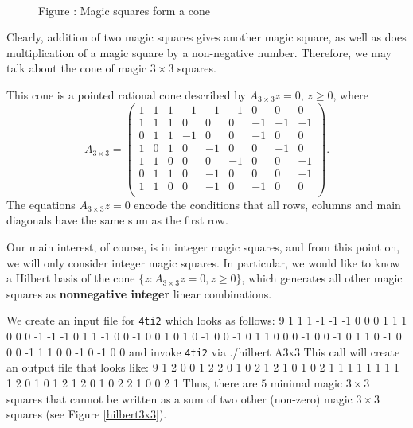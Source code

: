 \documentclass[12pt]{article}
\newenvironment{myverbatim}%
  {\quote\verbatim}%
  {\endverbatim\endquote}
\newcommand\File{\begingroup \urlstyle{sf}\Url}
\theoremstyle{definition}
\newcommand{\important}{\textbf}
\newcommand{\FourTiTwo}{{\tt 4ti2}}
\begin{document}
\begin{figure}[tbh]
\begin{center}
\\[.3cm]
 \label{Cone3x3} Figure \thefigure: Magic
squares form a cone
\end{center}
\vspace*{-0.3cm}
\end{figure}

Clearly, addition of two magic squares gives another magic square,
as well as does multiplication of a magic square by a non-negative
number. Therefore, we may talk about the cone of magic $3\times 3$
squares.

This cone is a pointed rational cone described by 
$A_{3\times 3}z=0$, $z\geq 0$, where
\[
A_{3\times 3}=
\left(
\begin{array}{rrrrrrrrr}
1 & 1 & 1 & -1 & -1 & -1 &  0 &  0 &  0\\
1 & 1 & 1 &  0 &  0 &  0 & -1 & -1 & -1\\
0 & 1 & 1 & -1 &  0 &  0 & -1 &  0 &  0\\
1 & 0 & 1 &  0 & -1 &  0 &  0 & -1 &  0\\
1 & 1 & 0 &  0 &  0 & -1 &  0 &  0 & -1\\
0 & 1 & 1 &  0 & -1 &  0 &  0 &  0 & -1\\
1 & 1 & 0 &  0 & -1 &  0 & -1 &  0 &  0\\
\end{array}
\right).
\]
The equations $A_{3\times 3}z=0$ encode the conditions that all
rows, columns and main diagonals have the same sum as the first
row.

Our main interest, of course, is in integer magic squares, and from
this point on, we will only consider integer magic squares.
In particular, we would like to know a Hilbert basis of the cone
$\{z:A_{3\times 3}z=0,z\geq 0\}$, which generates all other magic
squares as \important{nonnegative integer} linear combinations.

We create an input file \File{A3x3} for \FourTiTwo{} which looks as
follows:
\begin{myverbatim}
7 9
1 1 1 -1 -1 -1  0  0  0
1 1 1  0  0  0 -1 -1 -1
0 1 1 -1  0  0 -1  0  0
1 0 1  0 -1  0  0 -1  0
1 1 0  0  0 -1  0  0 -1
0 1 1  0 -1  0  0  0 -1
1 1 0  0 -1  0 -1  0  0
\end{myverbatim}
and invoke \FourTiTwo{} via
\begin{myverbatim}
./hilbert A3x3
\end{myverbatim}
This call will create an output file \File{A3x3.hil} that looks like:
\begin{myverbatim}
5 9
1 2 0 0 1 2 2 0 1
0 2 1 2 1 0 1 0 2
1 1 1 1 1 1 1 1 1
2 0 1 0 1 2 1 2 0
1 0 2 2 1 0 0 2 1
\end{myverbatim}
Thus, there are $5$ minimal magic $3\times 3$ squares that
cannot be written as a sum of two other (non-zero) magic $3\times 3$
squares (see Figure \ref{hilbert3x3}).
\end{document}
